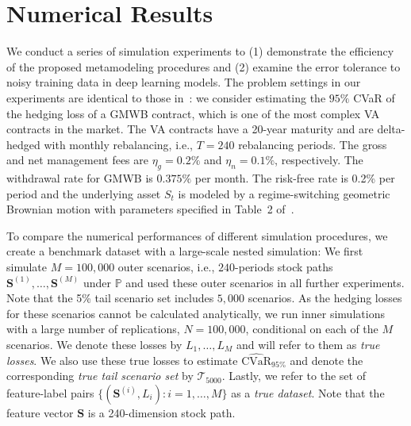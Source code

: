 \documentclass[]{article}
\newcommand{\CVaR}{\mbox{CVaR}}
\newcommand{\tail}{\mathcal{T}}
\newcommand{\bS}{\bm{S}}
\begin{document}
\section{Numerical Results} \label{sec:numerical}

We conduct a series of simulation experiments to (1) demonstrate the efficiency of the proposed metamodeling procedures and (2) examine the error tolerance to noisy training data in deep learning models.
The problem settings in our experiments are identical to those in~\cite{dang2020efficient}:
we consider estimating the $95\%$ CVaR of the hedging loss of a GMWB contract, which is one of the most complex VA contracts in the market.
The VA contracts have a 20-year maturity and are delta-hedged with monthly rebalancing, i.e., $T=240$ rebalancing periods.
The gross and net management fees are $\eta_g = 0.2\%$ and $\eta_n=0.1\%$, respectively.
The withdrawal rate for GMWB is $0.375\%$ per month.
The risk-free rate is 0.2\% per period and the underlying asset $S_t$ is modeled by a regime-switching geometric Brownian motion with parameters specified in Table~2 of~\cite{dang2020efficient}.

To compare the numerical performances of different simulation procedures, we create a benchmark dataset with a large-scale nested simulation: We first simulate $M=100\!,\!000$ outer scenarios, i.e., $240$-periods stock paths $\bS^{(1)},\ldots,\bS^{(M)}$ under $\mathbb{P}$ and used these outer scenarios in all further experiments.
Note that the 5\% tail scenario set includes $5\!,\!000$ scenarios.
As the hedging losses for these scenarios cannot be calculated analytically, we run inner simulations with a large number of replications, $N=100\!,\!000$, conditional on each of the $M$ scenarios.
We denote these losses by $L_1,\ldots,L_M$ and will refer to them as \textit{true losses}.
We also use these true losses to estimate $\widehat{\CVaR}_{95\%}$ and denote the corresponding \textit{true tail scenario set} by $\tail_{5000}$.
Lastly, we refer to the set of feature-label pairs $\{(\bS^{(i)}, L_i): i=1,\ldots,M\}$ as a \textit{true dataset}.
Note that the feature vector $\bS$ is a 240-dimension stock path.
\end{document}
